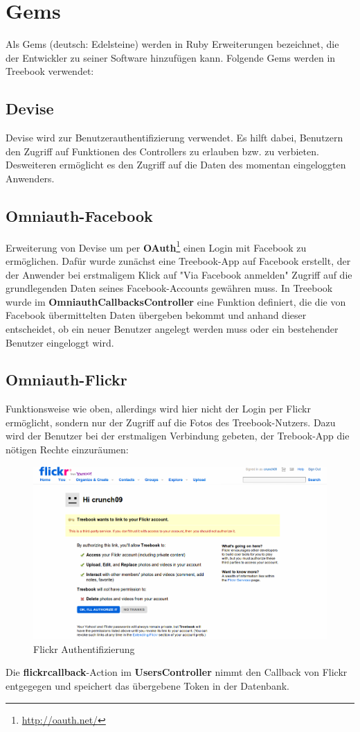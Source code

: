 \documentclass[10pt,a4paper]{book}
\makeatletter
\def\ScaleIfNeeded{%
\ifdim\Gin@nat@width>\linewidth
\linewidth
\else
\Gin@nat@width
\fi
}
\makeatother
\begin{document}
\section{Gems}
Als Gems (deutsch: Edelsteine) werden in Ruby Erweiterungen bezeichnet, die der Entwickler zu seiner Software hinzufügen kann. Folgende Gems werden in Treebook verwendet:
\subsection{Devise}
Devise wird zur Benutzerauthentifizierung verwendet. Es hilft dabei, Benutzern den Zugriff auf Funktionen des Controllers zu erlauben bzw. zu verbieten. Desweiteren ermöglicht es den Zugriff auf die Daten des momentan eingeloggten Anwenders.
\subsection{Omniauth-Facebook}
Erweiterung von Devise um per \textbf{OAuth}\footnote{\href{http://oauth.net/}{http://oauth.net/}} einen Login mit Facebook zu ermöglichen. 
Dafür wurde zunächst eine Treebook-App auf Facebook erstellt, der der Anwender bei erstmaligem Klick auf "Via Facebook anmelden" Zugriff auf 
die grundlegenden Daten seines Facebook-Accounts gewähren muss. In Treebook wurde im \textbf{OmniauthCallbacksController} eine Funktion 
definiert, die die von Facebook übermittelten Daten übergeben bekommt und anhand dieser entscheidet, ob ein neuer Benutzer angelegt werden muss oder ein bestehender Benutzer eingeloggt wird.
\subsection{Omniauth-Flickr}
Funktionsweise wie oben, allerdings wird hier nicht der Login per Flickr ermöglicht, sondern nur der Zugriff auf die Fotos des Treebook-Nutzers. Dazu wird der Benutzer bei der erstmaligen Verbindung gebeten, der Trebook-App die nötigen Rechte einzuräumen:
\begin{figure}[htbp]
\centering
\includegraphics[width=\ScaleIfNeeded]{Pictures/screen_flickr_auth.png}%
\caption{Flickr Authentifizierung}%
\end{figure}
Die \textbf{flickrcallback}-Action im \textbf{UsersController} nimmt den Callback von Flickr entgegegen und speichert das übergebene Token in der Datenbank.
\end{document}
